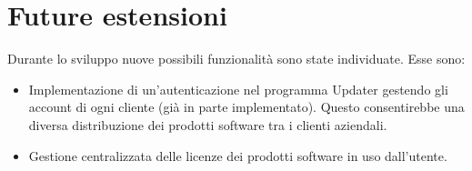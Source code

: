 \documentclass[../RelazioneFinale.tex]{subfiles}
\begin{document}
		\section{Future estensioni}
			Durante lo sviluppo nuove possibili funzionalità sono state individuate. Esse sono:
			\begin{itemize}
				\item Implementazione di un'autenticazione nel programma Updater gestendo gli account di ogni cliente (già in parte implementato). Questo consentirebbe una diversa distribuzione dei prodotti software tra i clienti aziendali.
				\item Gestione centralizzata delle licenze dei prodotti software in uso dall'utente.
			\end{itemize}
\end{document}
